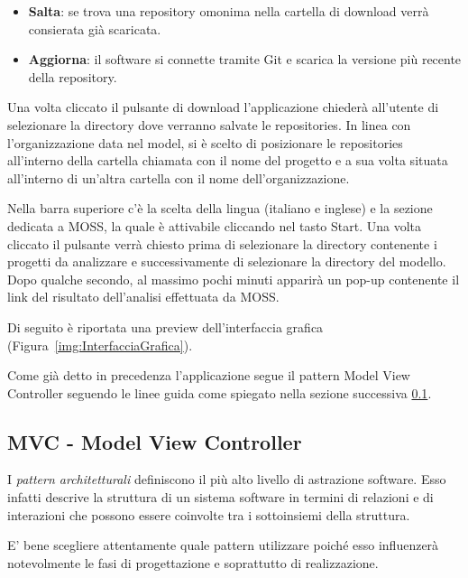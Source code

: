 		\begin{itemize}
			\item \textbf{Salta}: se trova una repository omonima nella cartella di download verrà consierata già scaricata.
			\item \textbf{Aggiorna}: il software si connette tramite Git e scarica la versione più recente della repository.
		\end{itemize}
	
		Una volta cliccato il pulsante di download l'applicazione chiederà all'utente di selezionare la directory dove verranno salvate le repositories.
		In linea con l'organizzazione data nel model, si è scelto di posizionare le repositories all'interno della cartella chiamata con il nome del progetto e a sua volta situata all'interno di un'altra cartella con il nome dell'organizzazione.
		
		Nella barra superiore c'è la scelta della lingua (italiano e inglese) e la sezione dedicata a MOSS, la quale è attivabile cliccando nel tasto Start. Una volta cliccato il pulsante verrà chiesto prima di selezionare la directory contenente i progetti da analizzare e successivamente di selezionare la directory del modello. Dopo qualche secondo, al massimo pochi minuti apparirà un pop-up contenente il link del risultato dell'analisi effettuata da MOSS.
		
		Di seguito è riportata una preview dell'interfaccia grafica (Figura~\ref{img:InterfacciaGrafica}).
		
		\begin{center}
			\label{img:InterfacciaGrafica}
		\end{center}
		
		Come già detto in precedenza l'applicazione segue il pattern Model View Controller seguendo le linee guida come spiegato nella sezione successiva \ref{def:MVC}.
		
		
		\subsection{MVC - Model View Controller}\label{def:MVC}
			\nocite{MVC-Slide}
			I \textit{pattern architetturali} definiscono il più alto livello di astrazione software. 
			Esso infatti descrive la struttura di un sistema software in termini di relazioni e di interazioni che possono essere coinvolte tra i sottoinsiemi della struttura. 
			
			E' bene scegliere attentamente quale pattern utilizzare poiché esso influenzerà notevolmente le fasi di progettazione e soprattutto di realizzazione. 
			
